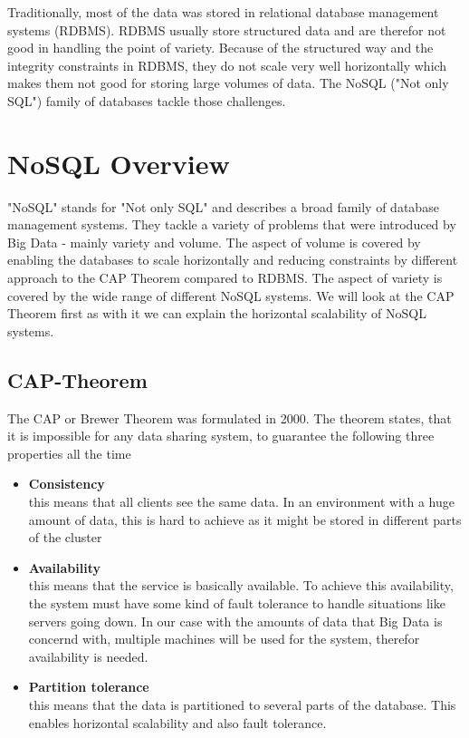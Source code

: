 \documentclass{acm_proc_article-sp}
\begin{document}
Traditionally, most of the data was stored in relational database management systems (RDBMS). RDBMS usually store structured data and are therefor not good in handling the point of variety. Because of the structured way and the integrity constraints in RDBMS, they do not scale very well horizontally which makes them not good for storing large volumes of data. The NoSQL ("Not only SQL") family of databases tackle those challenges.

\section{NoSQL Overview}

"NoSQL" stands for "Not only SQL" and describes a broad family of database management systems. They tackle a variety of problems that were introduced by Big Data - mainly variety and volume. The aspect of volume is covered by enabling the databases to scale horizontally and reducing constraints by different approach to the CAP Theorem compared to RDBMS. The aspect of variety is covered by the wide range of different NoSQL systems. We will look at the CAP Theorem first as with it we can explain the horizontal scalability of NoSQL systems.

\subsection{CAP-Theorem}

The CAP or Brewer Theorem\cite{Gilbert:2002:BCF:564585.564601} was formulated in 2000. The  theorem  states, that it is impossible for any data sharing system, to guarantee the following three properties all the time

\begin{itemize}
	\item \textbf{Consistency} \\ this means that all clients see the same data. In an environment with a huge amount of data, this is hard to achieve as it might be stored in different parts of the cluster
	\item \textbf{Availability} \\ this means that the service is basically available. To achieve this availability, the system must have some kind of fault tolerance to handle situations like servers going down. In our case with the amounts of data that Big Data is concernd with, multiple machines will be used for the system, therefor availability is needed.
	\item \textbf{Partition tolerance} \\ this means that the data is partitioned to several parts of the database. This enables horizontal scalability and also fault tolerance.
\end{itemize}
\end{document}
